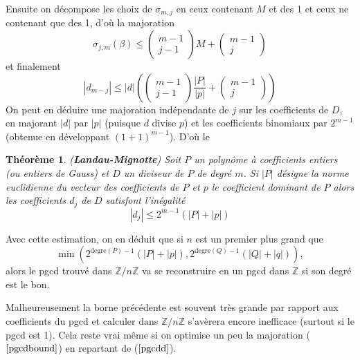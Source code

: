 \documentclass[a4paper,11pt]{article}
\newtheorem{thm}{Théorème}
\begin{document}
\begin{giacjshere}
Ensuite on décompose les choix de $\sigma_{m, j}$ en ceux contenant $M$ et
des 1 et ceux ne contenant que des 1, d'où la majoration
\[ \sigma_{j, m} ( \beta ) \leq \left(\begin{array}{c}
     m - 1\\
     j - 1
   \end{array}\right) M + \left(\begin{array}{c}
     m - 1\\
     j
   \end{array}\right)  \]
et finalement
\begin{equation}
  | d_{m - j} | \leq | d | \left( \left(\begin{array}{c}
    m - 1\\
    j - 1
  \end{array}\right)  \frac{| P |}{| p |} + \left(\begin{array}{c}
    m - 1\\
    j
  \end{array}\right) \right) \label{pgcdd}
\end{equation}
On peut en déduire une majoration indépendante de $j$ sur les coefficients de
$D$, en majorant $| d |$ par $| p |$ (puisque $d$ divise $p$) et les
coefficients binomiaux par $2^{m - 1}$ (obtenue en développant $( 1 + 1 )^{m -
1}$). D'où le

\begin{thm} 
  ({\bf Landau-Mignotte}) 
Soit $P$ un polynôme à coefficients entiers (ou entiers de
  Gauss) et $D$ un diviseur de $P$ de degré $m$. Si $| P |$ désigne la norme
  euclidienne du vecteur des coefficients de $P$ et $p$ le coefficient
  dominant de $P$ alors les coefficients $d_j$ de $D$ satisfont l'inégalité
  \begin{equation}
    | d_j | \leq 2^{m - 1} ( | P | + | p | )
  \end{equation}
\end{thm}

Avec cette estimation, on en déduit que si $n$ est un premier plus grand que
\begin{equation}
  \min \left( 2^{\mbox{degre} ( P ) - 1} ( | P | + | p | ),
  2^{\mbox{degre} ( Q ) - 1} ( | Q | + | q | ) \right), \label{pgcdbound}
\end{equation}
alors le pgcd trouvé dans $\mathbb{Z} / n \mathbb{Z}$ va se reconstruire en un
pgcd dans $\mathbb{Z}$ si son degré est le bon.

Malheureusement la borne précédente est souvent très grande par rapport aux
coefficients du pgcd et calculer dans $\mathbb{Z} / n \mathbb{Z}$ s'avèrera
encore inefficace (surtout si le pgcd est 1). Cela reste vrai même si on
optimise un peu la majoration (\(\ref{pgcdbound}\)) en repartant de 
(\(\ref{pgcdd}\)).


\end{giacjshere}
\end{document}
